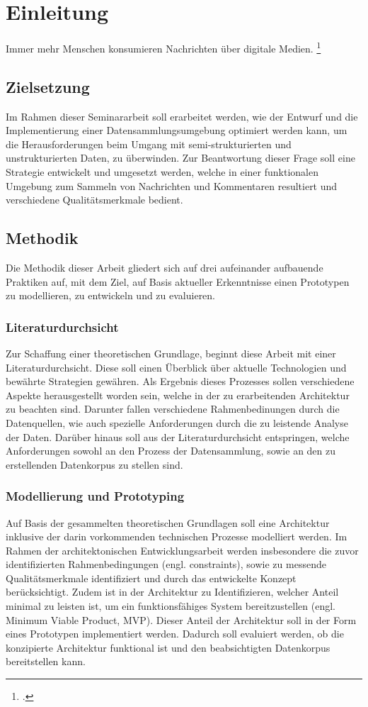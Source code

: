 \section{Einleitung} 
Immer mehr Menschen konsumieren Nachrichten über digitale Medien. \footcite [Vgl.][] {IfDAllensbach2023}

\subsection{Zielsetzung}
Im Rahmen dieser Seminararbeit soll erarbeitet werden, wie der Entwurf und die Implementierung einer Datensammlungsumgebung optimiert werden kann, um die Herausforderungen beim Umgang mit semi-strukturierten und unstrukturierten Daten, zu überwinden.
Zur Beantwortung dieser Frage soll eine Strategie entwickelt und umgesetzt werden, welche in einer funktionalen Umgebung zum Sammeln von Nachrichten und Kommentaren resultiert und verschiedene Qualitätsmerkmale bedient. 

\subsection{Methodik}
Die Methodik dieser Arbeit gliedert sich auf drei aufeinander aufbauende Praktiken auf, mit dem Ziel, auf Basis aktueller Erkenntnisse einen Prototypen zu modellieren, zu entwickeln und zu evaluieren. 

\subsubsection{Literaturdurchsicht}
Zur Schaffung einer theoretischen Grundlage, beginnt diese Arbeit mit einer Literaturdurchsicht. Diese soll einen Überblick über aktuelle Technologien und bewährte Strategien gewähren. 
Als Ergebnis dieses Prozesses sollen verschiedene Aspekte herausgestellt worden sein, welche in der zu erarbeitenden Architektur zu beachten sind. Darunter fallen verschiedene Rahmenbedinungen durch die Datenquellen, wie auch spezielle Anforderungen durch die zu leistende Analyse der Daten.
Darüber hinaus soll aus der Literaturdurchsicht entspringen, welche Anforderungen sowohl an den Prozess der Datensammlung, sowie an den zu erstellenden Datenkorpus zu stellen sind. 

\subsubsection{Modellierung und Prototyping}
Auf Basis der gesammelten theoretischen Grundlagen soll eine Architektur inklusive der darin vorkommenden technischen Prozesse modelliert werden. 
Im Rahmen der architektonischen Entwicklungsarbeit werden insbesondere die zuvor identifizierten Rahmenbedingungen (engl. constraints), sowie zu messende Qualitätsmerkmale identifiziert und durch das entwickelte Konzept berücksichtigt. 
Zudem ist in der Architektur zu Identifizieren, welcher Anteil minimal zu leisten ist, um ein funktionsfähiges System bereitzustellen (engl. Minimum Viable Product, MVP).
Dieser Anteil der Architektur soll in der Form eines Prototypen implementiert werden. Dadurch soll evaluiert werden, ob die konzipierte Architektur funktional ist und den beabsichtigten Datenkorpus bereitstellen kann.

